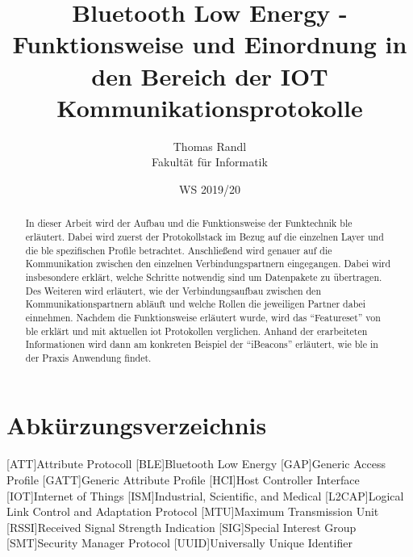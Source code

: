 \documentclass[twoside=true, %
    DIV=15
    ,%
    BCOR=15mm, %
    headinclude=true,
    footinclude=false,
    pagesize,%
    fontsize=12pt,%
    paper=a4,%
    numbers=noenddot
  ]{scrartcl}
\begin{document}
\def\figdir{figures}
\def\tabledir{tables}

\titlehead{
\raggedleft
\texttt{[image: \\figdir/logo-th-rosenheim-2019\_master\_quer\_2c.eps]}
}

\title{
\vspace*{0cm}
Bluetooth Low Energy - Funktionsweise und Einordnung in den Bereich der IOT Kommunikationsprotokolle
}

\author{
Thomas Randl\\
Fakultät für Informatik}

\date{WS 2019/20}

\maketitle

\begin{abstract}
In dieser Arbeit wird der Aufbau und die Funktionsweise der Funktechnik \ac{ble} erläutert. Dabei wird zuerst der Protokollstack im Bezug auf die einzelnen Layer und die \ac{ble} spezifischen Profile betrachtet. Anschließend wird genauer auf die Kommunikation zwischen den einzelnen Verbindungspartnern eingegangen. Dabei wird insbesondere erklärt, welche Schritte notwendig sind um Datenpakete zu übertragen. Des Weiteren wird erläutert, wie der Verbindungsaufbau zwischen den Kommunikationspartnern abläuft und welche Rollen die jeweiligen Partner dabei einnehmen. Nachdem die Funktionsweise erläutert wurde, wird das "`Featureset"' von \ac{ble} erklärt und mit aktuellen \ac{iot} Protokollen verglichen. Anhand der erarbeiteten Informationen wird dann am konkreten Beispiel der "`iBeacons"' erläutert, wie \ac{ble} in der Praxis Anwendung findet.
\end{abstract}

\newpage

\tableofcontents

\newpage

\section*{Abkürzungsverzeichnis} %
\begin{acronym}[ECUAF]
	[ATT]{Attribute Protocoll}
	[BLE]{Bluetooth Low Energy}
	[GAP]{Generic Access Profile}
	[GATT]{Generic Attribute Profile}
	[HCI]{Host Controller Interface}
	[IOT]{Internet of Things}
	[ISM]{Industrial, Scientific, and Medical}
	[L2CAP]{Logical Link Control and Adaptation Protocol}
	[MTU]{Maximum Transmission Unit}
	[RSSI]{Received Signal Strength Indication}
	[SIG]{Special Interest Group}
	[SMT]{Security Manager Protocol}
	[UUID]{Universally Unique Identifier}
\end{acronym}









\appendix





\end{document}

